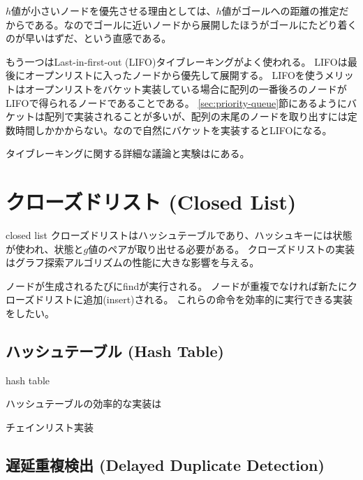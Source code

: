 $h$値が小さいノードを優先させる理由としては、$h$値がゴールへの距離の推定だからである。なのでゴールに近いノードから展開したほうがゴールにたどり着くのが早いはずだ、という直感である。

もう一つはLast-in-first-out (LIFO)タイブレーキングがよく使われる。
LIFOは最後にオープンリストに入ったノードから優先して展開する。
LIFOを使うメリットはオープンリストをバケット実装している場合に配列の一番後ろのノードがLIFOで得られるノードであることである。
\ref{sec:priority-queue}節にあるようにバケットは配列で実装されることが多いが、配列の末尾のノードを取り出すには定数時間しかかからない。なので自然にバケットを実装するとLIFOになる。


タイブレーキングに関する詳細な議論と実験は\cite{asai2016tiebreaking}にある。

\section{クローズドリスト (Closed List)}
\label{sec:closed-list}
{\TODO closed list}
クローズドリストはハッシュテーブルであり、ハッシュキーには状態が使われ、状態と$g$値のペアが取り出せる必要がある。
クローズドリストの実装はグラフ探索アルゴリズムの性能に大きな影響を与える。

ノードが生成されるたびにfindが実行される。
ノードが重複でなければ新たにクローズドリストに追加(insert)される。
これらの命令を効率的に実行できる実装をしたい。


\subsection{ハッシュテーブル (Hash Table)}
\label{sec:hash-table}

{\TODO hash table}

ハッシュテーブルの効率的な実装は

チェインリスト実装


\subsection{遅延重複検出 (Delayed Duplicate Detection)}
\label{sec:delayed-duplicate-detection}

